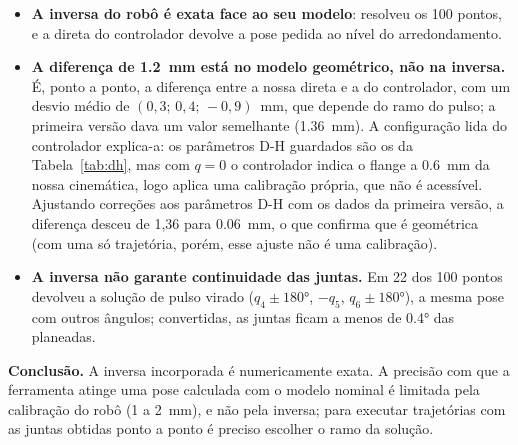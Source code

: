 \begin{itemize}[itemsep=3pt]
  \item \textbf{A inversa do robô é exata face ao seu modelo}: resolveu os
        100 pontos, e a direta do controlador devolve a pose pedida ao nível
        do arredondamento.
  \item \textbf{A diferença de \SI{1.2}{\milli\meter} está no modelo
        geométrico, não na inversa.} É, ponto a ponto, a diferença entre a
        nossa direta e a do controlador, com um desvio médio de
        $(0{,}3;\,0{,}4;\,-0{,}9)$~mm, que depende do ramo do pulso; a
        primeira versão dava um valor semelhante (\SI{1.36}{\milli\meter}). A configuração lida do controlador
        explica-a: os parâmetros D-H guardados são os da
        Tabela~\ref{tab:dh}, mas com $q=0$ o controlador indica o flange a
        \SI{0.6}{\milli\meter} da nossa cinemática, logo aplica uma
        calibração própria, que não é acessível. Ajustando correções
        aos parâmetros D-H com os dados da primeira versão, a diferença
        desceu de 1,36 para \SI{0.06}{\milli\meter}, o que confirma que é
        geométrica (com uma só trajetória, porém, esse ajuste não é uma
        calibração).
  \item \textbf{A inversa não garante continuidade das juntas.} Em 22 dos 100
        pontos devolveu a solução de pulso virado
        ($q_4 \pm \ang{180}$, $-q_5$, $q_6 \pm \ang{180}$), a mesma pose com
        outros ângulos; convertidas, as juntas ficam a menos de \ang{0.4}
        das planeadas.
\end{itemize}

\begin{destaque}
\textbf{Conclusão.} A inversa incorporada é numericamente exata. A precisão
com que a ferramenta atinge uma pose calculada com o modelo nominal é limitada
pela calibração do robô (1 a \SI{2}{\milli\meter}), e não pela inversa; para
executar trajetórias com as juntas obtidas ponto a ponto é preciso escolher o
ramo da solução.
\end{destaque}
